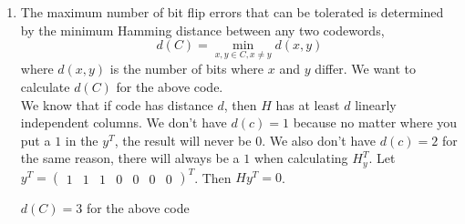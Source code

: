 \begin{enumerate}
\begin{itemize}
    \item $y_1^T = \begin{pmatrix} 0 & 1 & 0 & 1 & 1 & 0 & 0 \end{pmatrix}$
    \begin{align}
        H y_0^T &= \begin{pmatrix}
        0 & 0 & 0 & 1 & 1 & 1 & 1\\
        0 & 1 & 1 & 0 & 0 & 1 & 1\\
        1 & 0 & 1 & 0 & 1 & 0 & 1\end{pmatrix} \begin{pmatrix} 0 \\ 1 \\ 0 \\ 1 \\ 1 \\ 0 \\ 0\end{pmatrix} \\
        H y_2^T &= \begin{pmatrix} 0 & 1 & 1 \end{pmatrix}^T
    \end{align}
\end{itemize}

\item The maximum number of bit flip errors that can be tolerated is determined by the minimum Hamming distance between any two codewords, 
\begin{equation}
    d(C) = \min_{x,y \in C, x \neq y} d(x,y)
\end{equation}
where $d(x,y)$ is the number of bits where $x$ and $y$ differ. We want to calculate $d(C)$ for the above code.\\
We know that if code has distance $d$, then $H$ has at least $d$ linearly independent columns. We don't have $d(c) = 1$ because no matter where you put a $1$ in the $y^T$, the result will never be 0. We also don't have $d(c) = 2$ for the same reason, there will always be a $1$ when calculating $H_y^T$. Let $y^T = \begin{pmatrix}1 & 1 & 1 & 0 & 0 & 0 & 0\end{pmatrix}^T$. Then $Hy^T=0$. 

\begin{center}
$d(C)=3$ for the above code 
\end{center}
\end{enumerate}



\newpage
